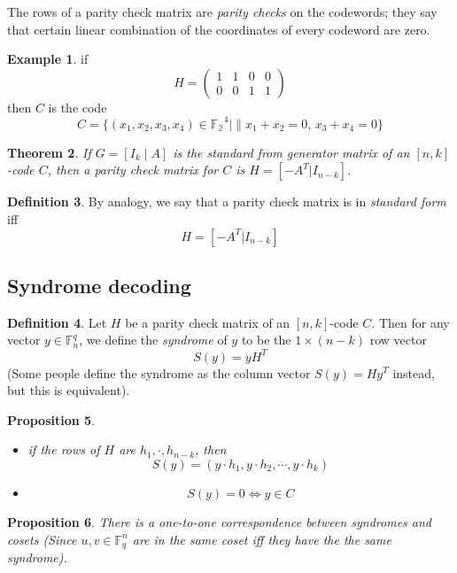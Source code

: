 \documentclass[11pt,a4paper]{article}
\theoremstyle{definition}
\newtheorem{definition}{Definition}[section]
\newtheorem{example}[definition]{Example}
\theoremstyle{plain}
\newtheorem{theorem}[definition]{Theorem}
\newtheorem{proposition}[definition]{Proposition}
\theoremstyle{remark}
\begin{document}
The rows of a parity check matrix are \emph{parity checks} on the codewords; they say that certain 
linear combination of the coordinates of every codeword are zero. 

\begin{example}
    if 
    $$H = \begin{pmatrix}
        1 & 1 & 0 & 0 \\
        0 & 0 & 1 & 1
    \end{pmatrix}$$
    then $C$ is the code 
    $$C = \{(x_1, x_2, x_3, x_4) \in \mathbb{F_2}^4 \mid \| x_1 + x_2 = 0, \, x_3 + x_4 = 0\}$$
\end{example}

\begin{theorem}\label{thm:standard-form-parity-check}
    If $G = [I_k \mid A]$ is the standard from generator matrix of an $[n,k]$-code $C$, then a parity check matrix for $C$ is 
    $H = [-A^T|I_{n - k}]$.  
\end{theorem}

\begin{definition}
    By analogy, we say that a parity check matrix is in \emph{standard form} iff
    $$H = [-A^T | I_{n-k}]$$
\end{definition}

\subsection{Syndrome decoding}

\begin{definition}
    Let $H$ be a parity check matrix of an $[n,k]$-code $C$. Then for any 
    vector $y \in \mathbb{F}_n^q$, we define the \emph{syndrome} of $y$ to be the $1 \times (n - k)$ row vector
    $$S(y) = y H^T$$ 
    (Some people define the syndrome as the column vector $S(y) = H y^T$ instead, but this is equivalent).
\end{definition}

\begin{proposition}
    \begin{itemize}
        \item if the rows of $H$ are $h_1, \cdot, h_{n-k}$, then 
        $$S(y) = (y \cdot h_1, y \cdot h_2, \cdots, y \cdot h_k)$$
        \item $$S(y) = 0 \iff y \in C$$
    \end{itemize}
\end{proposition}

\begin{proposition}
    There is a one-to-one correspondence between syndromes and cosets (Since $u, v \in \mathbb{F}_q^n$ are in the same coset iff they have the the same syndrome). 
\end{proposition}
\end{document}

